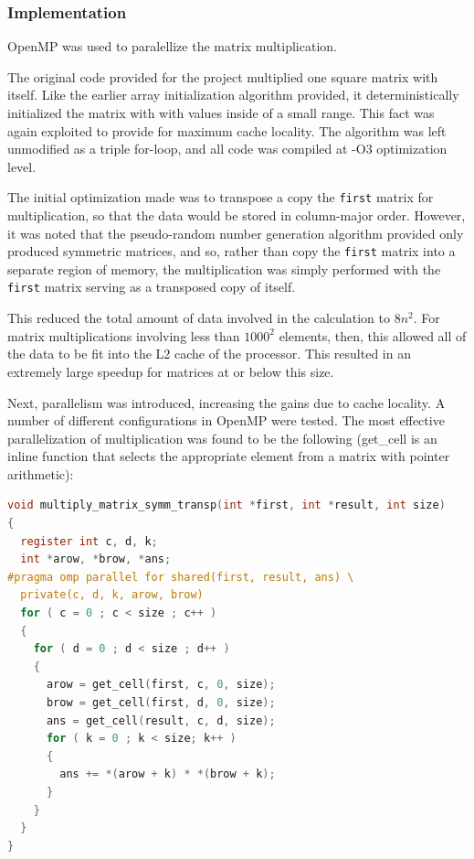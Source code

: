 \documentclass{article}
\begin{document}
\subsubsection{Implementation}
OpenMP was used to paralellize the matrix multiplication.

The original code provided for the project multiplied one square
matrix with itself. Like the earlier array initialization algorithm
provided, it deterministically initialized the matrix with with values
inside of a small range. This fact was again exploited to provide for
maximum cache locality. The algorithm was left unmodified as a triple
for-loop, and all code was compiled at -O3 optimization level.

The initial optimization made was to transpose a copy the
\texttt{first} matrix for multiplication, so that the data would be
stored in column-major order. However, it was noted that the
pseudo-random number generation algorithm provided only produced
symmetric matrices, and so, rather than copy the \texttt{first}
matrix into a separate region of memory, the multiplication was simply
performed with the \texttt{first} matrix serving as a transposed copy
of itself. 

This reduced the total amount of data involved in the calculation to
$8 n^2$. For matrix multiplications involving less than $1000^2$
elements, then, this allowed all of the data to be fit into the L2
cache of the processor. This resulted in an extremely large speedup
for matrices at or below this size. 

Next, parallelism was introduced, increasing the gains due to cache
locality. A number of different configurations in OpenMP were
tested. The most effective parallelization of multiplication was found
to be the following (get\_cell is an inline function that selects the
appropriate element from a matrix with pointer arithmetic):

\begin{lstlisting}[language=C]
void multiply_matrix_symm_transp(int *first, int *result, int size)
{
  register int c, d, k;
  int *arow, *brow, *ans;
#pragma omp parallel for shared(first, result, ans) \
  private(c, d, k, arow, brow)
  for ( c = 0 ; c < size ; c++ )
  {
    for ( d = 0 ; d < size ; d++ )
    {
      arow = get_cell(first, c, 0, size);
      brow = get_cell(first, d, 0, size);
      ans = get_cell(result, c, d, size);
      for ( k = 0 ; k < size; k++ )
      {
        ans += *(arow + k) * *(brow + k);
      }
    }
  }
}
\end{lstlisting}
\end{document}
